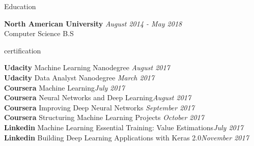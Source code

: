 \documentclass[10pt]{resume} %
\begin{document}
\begin{rSection}{Education}

{\bf North American University} \hfill {\em August 2014 - May 2018} 
\\ Computer Science B.S \hfill {}
 


\end{rSection}



\begin{rSection}{certification}

{\bf Udacity} Machine Learning Nanodegree \hfill {\em August 2017}
\\ {\bf Udacity} Data Analyst Nanodegree \hfill {\em March 2017}
\\ {\bf Coursera} Machine Learning\hfill {\em July 2017}
\\ {\bf Coursera} Neural Networks and Deep Learning\hfill {\em August 2017}
\\ {\bf Coursera} Improving Deep Neural Networks \hfill {\em September 2017}
\\ {\bf Coursera} Structuring Machine Learning Projects \hfill {\em October 2017}
\\ {\bf Linkedin} Machine Learning Essential Training: Value Estimations\hfill {\em July 2017}
\\ {\bf Linkedin} Building Deep Learning Applications with Keras 2.0\hfill {\em November 2017}
\\
\\


\end{rSection}

\end{document}
